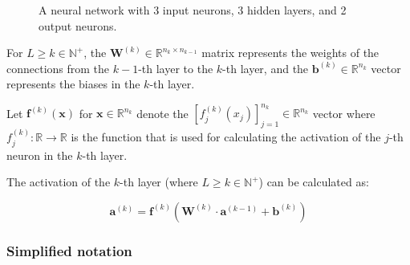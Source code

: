 \documentclass[titlepage]{article}
\begin{document}
\begin{figure}[!htb]
        \caption{%
          A neural network with 3 input neurons, 3 hidden layers, and 2 output
          neurons.
        }
      \end{figure}

      For $L \geq k \in \mathbb{N}^+$, the
      $\mathbf{W}^{(k)} \in \mathbb{R}^{n_{k} \times n_{k-1}}$ matrix represents
      the weights of the connections from the $k-1$-th layer to the $k$-th
      layer, and the $\mathbf{b}^{(k)} \in \mathbb{R}^{n_k}$ vector represents
      the biases in the $k$-th layer.

      Let $\mathbf{f}^{(k)} ( \mathbf{x} )$ for
      $\mathbf{x} \in \mathbb{R}^{n_k}$ denote the
      $\left[ f_j^{(k)} ( x_j ) \right]_{j=1}^{n_k} \in \mathbb{R}^{n_k}$ vector
      where $f_j^{(k)} : \mathbb{R} \rightarrow \mathbb{R}$ is the function
      that is used for calculating the activation of the $j$-th neuron in the
      $k$-th layer.

      The activation of the $k$-th layer (where $L \geq k \in \mathbb{N}^+$)
      can be calculated as:

      \begin{equation}\label{eqactivation}
        \mathbf{a}^{(k)} =
          \mathbf{f}^{(k)} \left(
            \mathbf{W}^{(k)} \cdot \mathbf{a}^{(k-1)} + \mathbf{b}^{(k)}
          \right)
      \end{equation}

      \subsubsection{Simplified notation}\label{simplifiednotation}
\end{document}
